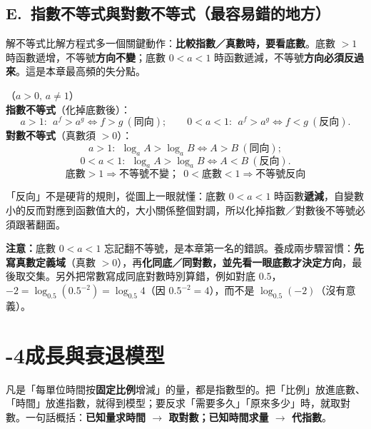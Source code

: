 \documentclass[11pt]{article}
\begin{document}
\subsection*{\sffamily E.\ 指數不等式與對數不等式（最容易錯的地方）}

解不等式比解方程式多一個關鍵動作：\textbf{比較指數／真數時，要看底數}。底數 $>1$ 時函數遞增，不等號\textbf{方向不變}；底數 $0<a<1$ 時函數遞減，不等號\textbf{方向必須反過來}。這是本章最高頻的失分點。

\begin{center}
（$a>0,\,a\ne1$）\\[2pt]
\textbf{指數不等式}（化掉底數後）：
$$a>1:\ \ a^{f}>a^{g}\iff f>g\ (\text{同向});\qquad 0<a<1:\ \ a^{f}>a^{g}\iff f<g\ (\text{反向}).$$
\textbf{對數不等式}（真數須 $>0$）：
$$a>1:\ \ \log_a A>\log_a B\iff A>B\ (\text{同向});$$
$$0<a<1:\ \ \log_a A>\log_a B\iff A<B\ (\text{反向}).$$
$$\boxed{\,\text{底數}>1\Rightarrow\text{不等號不變；}\ \ 0<\text{底數}<1\Rightarrow\text{不等號反向}\,}$$
\end{center}

「反向」不是硬背的規則，從圖上一眼就懂：底數 $0<a<1$ 時函數\textbf{遞減}，自變數小的反而對應到函數值大的，大小關係整個對調，所以化掉指數／對數後不等號必須跟著翻面。


\textbf{注意：}底數 $0<a<1$ 忘記翻不等號，是本章第一名的錯誤。養成兩步驟習慣：\textbf{先寫真數定義域}（真數 $>0$），再\textbf{化同底／同對數，並先看一眼底數才決定方向}，最後取交集。另外把常數寫成同底對數時別算錯，例如對底 $0.5$，$-2=\log_{0.5}(0.5^{-2})=\log_{0.5}4$（因 $0.5^{-2}=4$），而不是 $\log_{0.5}(-2)$（沒有意義）。

\section*{-4\quad 成長與衰退模型}

凡是「每單位時間按\textbf{固定比例}增減」的量，都是指數型的。把「比例」放進底數、「時間」放進指數，就得到模型；要反求「需要多久」「原來多少」時，就取對數。一句話概括：\textbf{已知量求時間 $\to$ 取對數；已知時間求量 $\to$ 代指數}。

\end{document}
